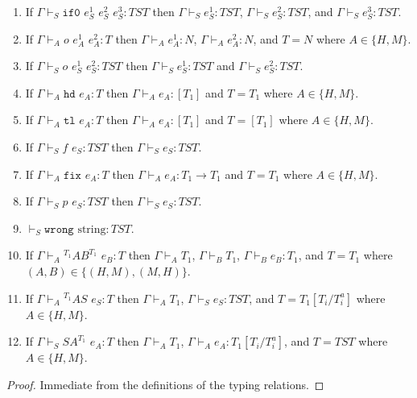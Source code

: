 \begin{lemma}
\begin{enumerate}
\item If $\Gamma\vdash_{S}\mathtt{if0}$ $e_{S}^{1}$ $e_{S}^{2}$ $e_{S}^{3}:TST$ then $\Gamma\vdash_{S}e_{S}^{1}:TST$, $\Gamma\vdash_{S}e_{S}^{2}:TST$, and $\Gamma\vdash_{S}e_{S}^{3}:TST$.
\item If $\Gamma\vdash_{A}o$ $e_{A}^{1}$ $e_{A}^{2}:T$ then $\Gamma\vdash_{A}e_{A}^{1}:N$, $\Gamma\vdash_{A}e_{A}^{2}:N$, and $T=N$ where $A\in\lbrace H,M\rbrace$.
\item If $\Gamma\vdash_{S}o$ $e_{S}^{1}$ $e_{S}^{2}:TST$ then $\Gamma\vdash_{S}e_{S}^{1}:TST$ and $\Gamma\vdash_{S}e_{S}^{2}:TST$.
\item If $\Gamma\vdash_{A}\mathtt{hd}$ $e_{A}:T$ then $\Gamma\vdash_{A}e_{A}:[T_{1}]$ and $T=T_{1}$ where $A\in\lbrace H,M\rbrace$.
\item If $\Gamma\vdash_{A}\mathtt{tl}$ $e_{A}:T$ then $\Gamma\vdash_{A}e_{A}:[T_{1}]$ and $T=[T_{1}]$ where $A\in\lbrace H,M\rbrace$.
\item If $\Gamma\vdash_{S}f$ $e_{S}:TST$ then $\Gamma\vdash_{S}e_{S}:TST$.
\item If $\Gamma\vdash_{A}\mathtt{fix}$ $e_{A}:T$ then $\Gamma\vdash_{A}e_{A}:T_{1}\rightarrow T_{1}$ and $T=T_{1}$ where $A\in\lbrace H,M\rbrace$.
\item If $\Gamma\vdash_{S}p$ $e_{S}:TST$ then $\Gamma\vdash_{S}e_{S}:TST$.
\item $\vdash_{S}\mathtt{wrong}$ $\mathrm{string}:TST$.
\item If $\Gamma\vdash_{A}{^{T_{1}}A}B^{T_{1}}$ $e_{B}:T$ then $\Gamma\vdash_{A}T_{1}$, $\Gamma\vdash_{B}T_{1}$, $\Gamma\vdash_{B}e_{B}:T_{1}$, and $T=T_{1}$ where $(A,B)\in\lbrace(H,M),(M,H)\rbrace$.
\item If $\Gamma\vdash_{A}{^{T_{1}}A}S$ $e_{S}:T$ then $\Gamma\vdash_{A}T_{1}$, $\Gamma\vdash_{S}e_{S}:TST$, and $T=T_{1}[T_{i}/T_{i}^{a}]$ where $A\in\lbrace H,M\rbrace$.
\item If $\Gamma\vdash_{S}SA^{T_{1}}$ $e_{A}:T$ then $\Gamma\vdash_{A}T_{1}$, $\Gamma\vdash_{A}e_{A}:T_{1}[T_{i}/T_{i}^{a}]$, and $T=TST$ where $A\in\lbrace H,M\rbrace$.
\end{enumerate}
\begin{proof}
Immediate from the definitions of the typing relations.
\end{proof}
\end{lemma}